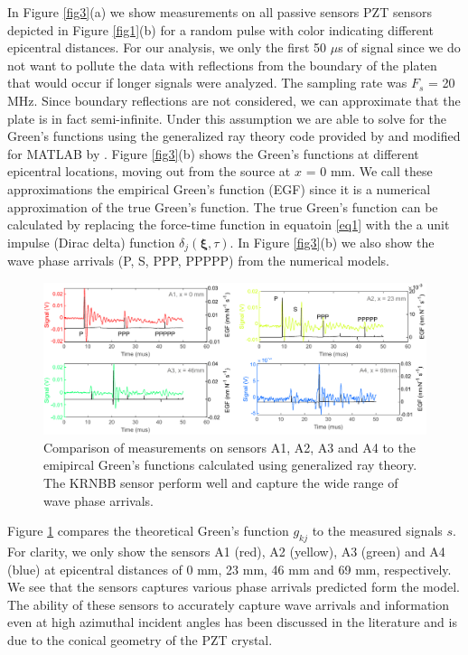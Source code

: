 \documentclass[preprint,3p, 11pt,authoryear]{elsarticle}
\begin{document}
In Figure \ref{fig3}(a) we show measurements on all passive sensors PZT sensors depicted in Figure \ref{fig1}(b) for a random pulse with color indicating different epicentral distances. For our analysis, we only the first 50 $\mu$s of signal since we do not want to pollute the data with reflections from the boundary of the platen that would occur if longer signals were analyzed. The sampling rate was $F_{s}$ = 20 MHz. Since boundary reflections are not considered, we can approximate that the plate is in fact semi-infinite. Under this assumption we are able to solve for the Green's functions using the generalized ray theory code provided by \citet{Hsu1985} and modified for MATLAB by \citet{McLaskey2012}.  Figure \ref{fig3}(b) shows the Green's functions at different epicentral locations, moving out from the source at $x$ = 0 mm. We call these approximations the empirical Green's function (EGF) since it is a numerical approximation of the true Green's function.  The true Green's function can be calculated by replacing the force-time function in equatoin \eqref{eq1} with the a unit impulse (Dirac delta) function $\delta_{j}(\mathbf{\xi}, \tau)$. In Figure \ref{fig3}(b) we also show the wave phase arrivals (P, S, PPP, PPPPP) from the numerical models.

\begin{figure}[ht]
     	\centering
\includegraphics[scale= 0.90]{FIG4.pdf} 
\caption{Comparison of measurements on sensors A1, A2, A3 and A4 to the emipircal Green's functions calculated using generalized ray theory. The KRNBB sensor perform well and capture the wide range of wave phase arrivals.}
	\label{fig4} 
\end{figure}

Figure \ref{fig4} compares the theoretical Green's function $g_{kj}$ to the measured signals $s$.  For clarity, we only show the sensors A1 (red), A2 (yellow), A3 (green) and A4 (blue) at epicentral distances of 0 mm, 23 mm, 46 mm and 69 mm, respectively. We see that the sensors captures various phase arrivals predicted form the model. The ability of these sensors to accurately capture wave arrivals and information even at high azimuthal incident angles has been discussed in the literature \citep{Goodfellow2015, Selvadurai2019} and is due to the conical geometry of the PZT crystal. 
\end{document}
